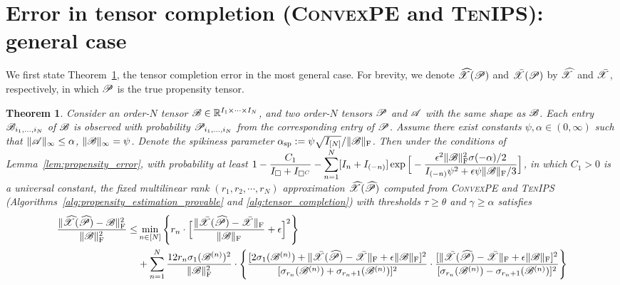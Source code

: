 \documentclass{article}
\newcommand{\T}[2][]{#1\mathscr{\MakeUppercase{#2}}}
\newcommand{\norm}[1]{\Vert #1 \Vert}
\newcommand{\fnorm}[1]{\norm{#1}_{\mathrm{F}}}
\newcommand{\maxnorm}[1]{\norm{#1}_{\infty}}
\def\Xh{\widehat X}
\def\Ph{\widehat P}
\theoremstyle{plain}
\newtheorem{theorem}{Theorem}
\begin{document}



\appendix
\section{Error in tensor completion (\textsc{ConvexPE} and \textsc{TenIPS}): general case}
\label{sec:error-in-tensor-completion-formal}
We first state Theorem~\ref{thm:main-theorem-formal}, the tensor completion error in the most general case.
For brevity, we denote $\T{\Xh}(\T{P})$ and $\bar{\T{X}}(\T{P})$ by $\T{\Xh}$ and $\bar{\T{X}}$, respectively, in which $\T{P}$ is the true propensity tensor.

\begin{theorem}
	\label{thm:main-theorem-formal}
	Consider an order-$N$ tensor $\T{B} \in \mathbb{R}^{I_1 \times \cdots \times I_N}$, and two order-$N$ tensors $\T{P}$ and $\T{A}$ with the same shape as $\T{B}$.
	Each entry $\T{B}_{i_1, \ldots, i_N}$ of $\T{B}$ is observed with probability $\T{P}_{i_1, \ldots, i_N}$ from the corresponding entry of $\T{P}$.
	Assume there exist constants $\psi, \alpha \in (0,\infty)$ such that $\maxnorm{\T{A}} \leq \alpha$, $\maxnorm{\T{B}} = \psi$.
	Denote the spikiness parameter $\alpha_\mathrm{sp} := \psi \sqrt{I_{[N]}} / \fnorm{\T{B}}$.
	Then under the conditions of Lemma~\ref{lem:propensity_error}, with probability at least $\displaystyle 1 - \frac{C_1}{I_\square + I_{\square^C}} - \sum_{n=1}^N [I_n + I_{(-n)}] \exp \Big[- \frac{\epsilon^2 \fnorm{\T{B}}^2 \sigma(- \alpha)/ 2}{I_{(-n)} \psi^2 + \epsilon \psi \fnorm{\T{B}}/3}\Big]$, in which $C_1 > 0$ is a universal constant, the fixed multilinear rank $(r_1, r_2, \cdots, r_N)$ approximation $\widehat{\T{X}}(\widehat{\T{P}})$ computed from \textsc{ConvexPE} and \textsc{TenIPS} (Algorithms~\ref{alg:propensity_estimation_provable} and \ref{alg:tensor_completion}) with thresholds $\tau \geq \theta$ and $\gamma \geq \alpha$ satisfies
	\begin{equation}
		\begin{aligned}
			\frac{\fnorm{\widehat{\T{X}}(\widehat{\T{P}}) - \T{B}}^2}{\fnorm{\T{B}}^2} \leq & \min_{n \in [N]} \Bigg\{r_n \cdot \Big[\frac{\fnorm{\bar{\T{X}}(\T{\Ph}) - \bar{\T{X}}}}{\fnorm{\T{B}}} + \epsilon \Big]^2 \Bigg\} \\
			& + \sum_{n=1}^N \frac{12 r_n \sigma_1 (\T{B}^{(n)})^2}{\fnorm{\T{B}}^2}  \cdot \Bigg\{\frac{[2 \sigma_1 (\T{B}^{(n)}) + \fnorm{\bar{\T{X}}(\T{\Ph}) - \bar{\T{X}}} + \epsilon \fnorm{\T{B}}]^2}{[\sigma_{r_n} (\T{B}^{(n)}) + \sigma_{r_n+1} (\T{B}^{(n)})]^2} \cdot \frac{[\fnorm{\bar{\T{X}}(\T{\Ph}) - \bar{\T{X}}} + \epsilon \fnorm{\T{B}}]^2}{[\sigma_{r_n} (\T{B}^{(n)}) - \sigma_{r_n+1} (\T{B}^{(n)})]^2} \Bigg\}\\

\end{aligned}
\end{equation}
\end{theorem}
\end{document}
